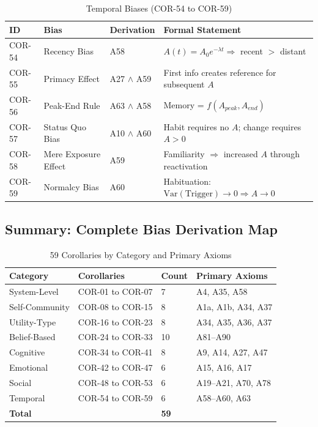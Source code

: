 \begin{table}[htbp]
\small
\centering
\caption{Temporal Biases (COR-54 to COR-59)}
\label{tab:cor-temporal}
\begin{tabular}{p{1.2cm}p{2.8cm}p{3.8cm}p{5cm}}
\toprule
\textbf{ID} & \textbf{Bias} & \textbf{Derivation} & \textbf{Formal Statement} \\
\midrule
COR-54 & Recency Bias & A58 & $A(t) = A_0 e^{-\lambda t} \Rightarrow$ recent $>$ distant \\
COR-55 & Primacy Effect & A27 $\land$ A59 & First info creates reference for subsequent $A$ \\
COR-56 & Peak-End Rule & A63 $\land$ A58 & Memory = $f(A_{peak}, A_{end})$ \\
COR-57 & Status Quo Bias & A10 $\land$ A60 & Habit requires no $A$; change requires $A > 0$ \\
COR-58 & Mere Exposure Effect & A59 & Familiarity $\Rightarrow$ increased $A$ through reactivation \\
COR-59 & Normalcy Bias & A60 & Habituation: $\text{Var}(\text{Trigger}) \to 0 \Rightarrow A \to 0$ \\
\bottomrule
\end{tabular}
\end{table}


\subsection{Summary: Complete Bias Derivation Map}

\begin{table}[htbp]
\centering
\caption{59 Corollaries by Category and Primary Axioms}
\label{tab:cor-summary}
\begin{tabular}{llll}
\toprule
\textbf{Category} & \textbf{Corollaries} & \textbf{Count} & \textbf{Primary Axioms} \\
\midrule
System-Level & COR-01 to COR-07 & 7 & A4, A35, A58 \\
Self-Community & COR-08 to COR-15 & 8 & A1a, A1b, A34, A37 \\
Utility-Type & COR-16 to COR-23 & 8 & A34, A35, A36, A37 \\
Belief-Based & COR-24 to COR-33 & 10 & A81--A90 \\
Cognitive & COR-34 to COR-41 & 8 & A9, A14, A27, A47 \\
Emotional & COR-42 to COR-47 & 6 & A15, A16, A17 \\
Social & COR-48 to COR-53 & 6 & A19--A21, A70, A78 \\
Temporal & COR-54 to COR-59 & 6 & A58--A60, A63 \\
\midrule
\textbf{Total} & & \textbf{59} & \\
\bottomrule
\end{tabular}
\end{table}

